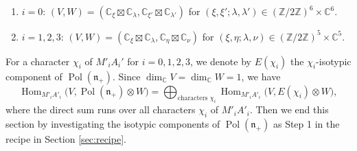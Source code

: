\documentclass[a4paper,11pt,reqno]{amsart}
\newcommand{\frakn}{\mathfrak{n}}
\newcommand{\CC}{\mathbb{C}}
\newcommand{\ZZ}{\mathbb{Z}}
\newcommand{\0}{{\bf 0}}
\newcommand{\Z}{\mathbb{Z}}
\newcommand{\C}{\mathbb{C}}
\newcommand{\1}{{\bf 1}}
\DeclareMathOperator{\Hom}{Hom}
\DeclareMathOperator{\Pol}{Pol}
\theoremstyle{plain}
\theoremstyle{definition}
\numberwithin{equation}{section}
\theoremstyle{definition}
\begin{document}
\begin{enumerate}[label = \normalfont{(\arabic*)}]

\item $i=0$: 
$(V, W) = (\CC_\xi\boxtimes \CC_{\lambda},\CC_{\xi'}\boxtimes \CC_{\lambda'})$
for $(\xi, \xi'; \lambda, \lambda')\in (\Z/2\Z)^6 \times \C^6$.

\vskip 0.1in

\item $i=1,2,3$: 
$(V,W) = (\CC_\xi\boxtimes \CC_{\lambda},\CC_{\eta}\boxtimes \CC_{\nu})$
for $(\xi,\eta;\lambda,\nu) \in (\ZZ/2\ZZ)^5 \times \CC^5$.
\vskip 0.1in

\end{enumerate}

For a character $\chi_i$ of $M'_iA_i'$ for $i= 0,1,2,3$,
we denote by $E(\chi_i)$ the 
$\chi_i$-isotypic component of $\Pol(\frakn_+)$. 
Since $\dim_\C V= \dim_\C W=1$, we have 
\begin{equation}\label{eqn:HomMA}
\Hom_{M'_iA'_i}\big(V,\Pol(\frakn_+)\otimes W\big)
= \bigoplus_{\text{characters $\chi_i$}} \Hom_{M'_iA'_i}\big(V,E(\chi_i)\otimes W\big),
\end{equation}
where the direct sum runs over all characters $\chi_i$ of $M'_iA'_i$.
Then we end this section by investigating the 
isotypic components of $\Pol(\frakn_+)$ as Step 1 in the recipe in 
Section \ref{sec:recipe}.
\end{document}

